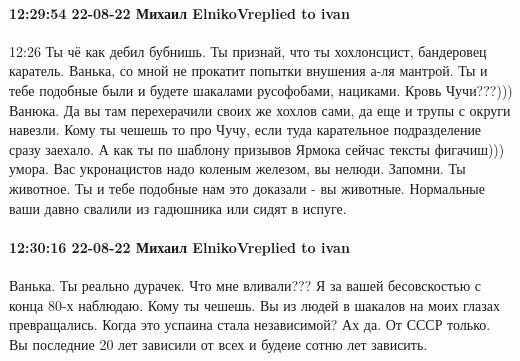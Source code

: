  
 
 
 
 

\paragraph{12:29:54 22-08-22 Михаил ElnikoVreplied to ivan}

12:26
Ты чё как дебил бубнишь. Ты признай, что ты хохлонсцист, бандеровец каратель. Ванька, со мной не прокатит попытки внушения а-ля мантрой.
Ты и тебе подобные были и будете шакалами русофобами, нациками.
Кровь Чучи???))) Ванюка. Да вы там перехерачили своих же хохлов сами, да еще и трупы с округи навезли. Кому ты чешешь то про Чучу, если туда карательное подразделение сразу заехало.
А как ты по шаблону призывов Ярмока сейчас тексты фигачиш))) умора.
Вас укронацистов надо коленым железом, вы нелюди. Запомни. Ты животное. Ты и тебе подобные нам это доказали - вы животные. Нормальные ваши давно свалили из гадюшника или сидят в испуге.

\paragraph{12:30:16 22-08-22 Михаил ElnikoVreplied to ivan}

Ванька. Ты реально дурачек. Что мне вливали??? Я за вашей бесовскостью с конца 80-х наблюдаю. Кому ты чешешь. Вы из людей в шакалов на моих глазах превращались. Когда это успаина стала независимой? Ах да. От СССР только. Вы последние 20 лет зависили от всех и будеие сотню лет зависить.
